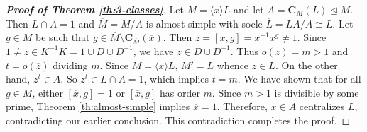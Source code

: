 \documentclass[twoside,a4paper,reqno,12pt]{amsart}
\newcommand{\<}{\langle}
\renewcommand{\>}{\rangle}
\newcommand{\la}{\langle}
\newcommand{\ra}{\rangle}
\newcommand{\CB}{\mathbf{C}}
\renewcommand{\:}{\colon}
\theoremstyle{definition}
\begin{document}
\begin{proof}[\textbf{Proof of Theorem \ref{th:3-classes}}]
Let $M=\la x\ra L$ and let $A=\CB_M(L)\unlhd M$.  Then  $L\cap A=1$ and $\overline{M}=M/A$ is  almost simple  with socle $\overline{L}=LA/A\cong L$. Let $g\in M$ be such that $\overline{g}\in \overline{M}\setminus \CB_{\overline{M}}(\overline{x})$. Then  $z=[x,g]=x^{-1}x^g\neq 1$. Since $1\neq z\in K^{-1}K=1\cup D\cup D^{-1}$, we have $z\in D\cup D^{-1}$. Thus $o(z)=m>1$ and  $t=o(\overline{z})$ dividing $m$. Since $M=\la x\ra L$, $M'=L$ whence $z\in L$. On the other hand, $z^t\in A$. So $z^t\in L\cap A=1$, which implies $t=m$. We have shown that for all $\overline{g}\in\overline{M}$, either $[\overline{x},\overline{g}]=\overline{1}$  or $[\overline{x},\overline{g}]$ has order $m$. Since $m>1$ is divisible by some prime, Theorem \ref{th:almost-simple} implies $\overline{x}=\overline{1}$. Therefore, $x\in A$ centralizes $L$, contradicting our earlier conclusion. This contradiction completes the proof.
\end{proof}
\end{document}

